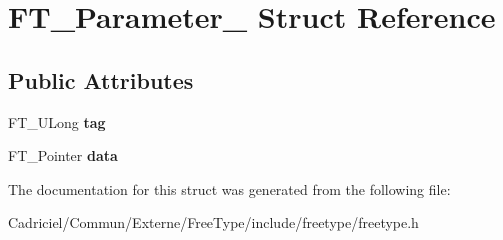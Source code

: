 \hypertarget{struct_f_t___parameter__}{}\section{F\+T\+\_\+\+Parameter\+\_\+ Struct Reference}
\label{struct_f_t___parameter__}
\subsection*{Public Attributes}
\begin{DoxyCompactItemize}
\item 
F\+T\+\_\+\+U\+Long {\bfseries tag}\hypertarget{struct_f_t___parameter___a5a53ef2652683a2cd9ee6a0a694cb76b}{}\label{struct_f_t___parameter___a5a53ef2652683a2cd9ee6a0a694cb76b}

\item 
F\+T\+\_\+\+Pointer {\bfseries data}\hypertarget{struct_f_t___parameter___a930c8885bd25be8d054443153c817c13}{}\label{struct_f_t___parameter___a930c8885bd25be8d054443153c817c13}

\end{DoxyCompactItemize}


The documentation for this struct was generated from the following file\+:\begin{DoxyCompactItemize}
\item 
Cadriciel/\+Commun/\+Externe/\+Free\+Type/include/freetype/freetype.\+h\end{DoxyCompactItemize}
